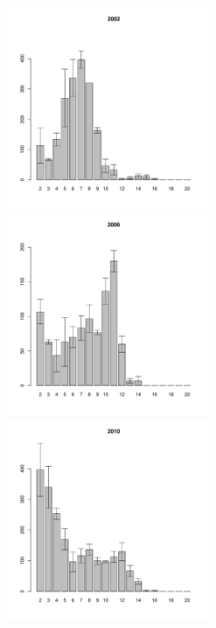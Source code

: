 \begin{figure}[hp]
\begin{minipage}[b]{.3\linewidth}
\begin{center}
	\end{center}
	\end{minipage}
	\begin{minipage}[b]{.3\linewidth}
	\begin{center}
	\includegraphics[width=60mm]{../White_Sea/Estuatiy_Luvenga/sizestr2_2002_.pdf}
	\end{center}
	\end{minipage}
	\hfill	
	\begin{minipage}[b]{.3\linewidth}
	\begin{center}
	\includegraphics[width=60mm]{../White_Sea/Estuatiy_Luvenga/sizestr2_2006_.pdf}
	\end{center}
	\end{minipage}
	\hfill
	\begin{minipage}[b]{.3\linewidth}
	\begin{center}
	\includegraphics[width=60mm]{../White_Sea/Estuatiy_Luvenga/sizestr2_2010_.pdf}

\end{center}
\end{minipage}
\end{figure}
